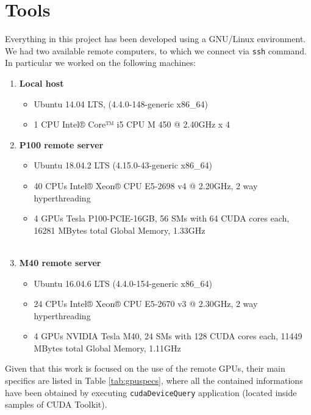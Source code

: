 \chapter{Tools} \label{chap:tools}

Everything in this project has been developed using a GNU/Linux environment.
We had two available remote computers, to which we connect via \texttt{ssh} command.\\
In particular we worked on the following machines:
	\begin{enumerate}
		\item \textbf{Local host}
		\begin{itemize} 
			\item Ubuntu 14.04 LTS, (4.4.0-148-generic x86\_64)
			\item 1 CPU Intel® Core™ i5 CPU M 450 @ 2.40GHz x 4 
		\end{itemize}
		
		\item \textbf{P100 remote server}
		\begin{itemize}
			\item Ubuntu 18.04.2 LTS (4.15.0-43-generic x86\_64)	
			\item 40 CPUs Intel® Xeon® CPU E5-2698 v4 @ 2.20GHz, 2 way hyperthreading	
			\item 4 GPUs Tesla P100-PCIE-16GB, 56 SMs with 64 CUDA cores each, 16281 MBytes total Global Memory, 1.33GHz  \\\\
		\end{itemize}
		 
		\item\textbf{ M40 remote server}
		\begin{itemize}
			\item Ubuntu 16.04.6 LTS (4.4.0-154-generic x86\_64)
			\item 24 CPUs Intel® Xeon® CPU E5-2670 v3 @ 2.30GHz, 2 way hyperthreading	
			\item 4 GPUs NVIDIA Tesla M40, 24 SMs with 128 CUDA cores each, 11449 MBytes total Global Memory, 1.11GHz 
		\end{itemize}
	\end{enumerate}
	Given that this work is focused on the use of the remote GPUs, their main specifics are listed in Table \ref{tab:gpuspecs}, where all the contained informations have been obtained by executing \texttt{cudaDeviceQuery} application (located inside samples of CUDA Toolkit).\\
